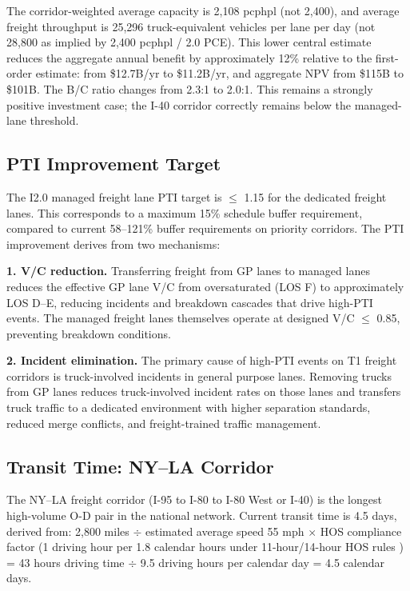The corridor-weighted average capacity is 2,108 pcphpl (not 2,400), and average
freight throughput is 25,296 truck-equivalent vehicles per lane per day (not
28,800 as implied by 2,400 pcphpl / 2.0 PCE). This lower central estimate
reduces the aggregate annual benefit by approximately 12\% relative to the
first-order estimate: from \$12.7B/yr to \$11.2B/yr, and aggregate NPV from
\$115B to \$101B. The B/C ratio changes from 2.3:1 to 2.0:1. This remains a
strongly positive investment case; the I-40 corridor correctly remains below
the managed-lane threshold.

\subsection{PTI Improvement Target}

The I2.0 managed freight lane PTI target is $\leq$ 1.15 for the dedicated freight lanes. This corresponds to a maximum 15\% schedule buffer requirement, compared to current 58--121\% buffer requirements on priority corridors. The PTI improvement derives from two mechanisms:

\textbf{1. V/C reduction.} Transferring freight from GP lanes to managed lanes reduces the effective GP lane V/C from oversaturated (LOS F) to approximately LOS D--E, reducing incidents and breakdown cascades that drive high-PTI events. The managed freight lanes themselves operate at designed V/C $\leq$ 0.85, preventing breakdown conditions.

\textbf{2. Incident elimination.} The primary cause of high-PTI events on T1 freight corridors is truck-involved incidents in general purpose lanes. Removing trucks from GP lanes reduces truck-involved incident rates on those lanes and transfers truck traffic to a dedicated environment with higher separation standards, reduced merge conflicts, and freight-trained traffic management.

\subsection{Transit Time: NY--LA Corridor}

The NY--LA freight corridor (I-95 to I-80 to I-80 West or I-40) is the longest high-volume O-D pair in the national network. Current transit time is 4.5 days, derived from: 2,800 miles $\div$ estimated average speed 55 mph $\times$ HOS compliance factor (1 driving hour per 1.8 calendar hours under 11-hour/14-hour HOS rules \citep{FMCSA_HOS2024}) = 43 hours driving time $\div$ 9.5 driving hours per calendar day = 4.5 calendar days.


